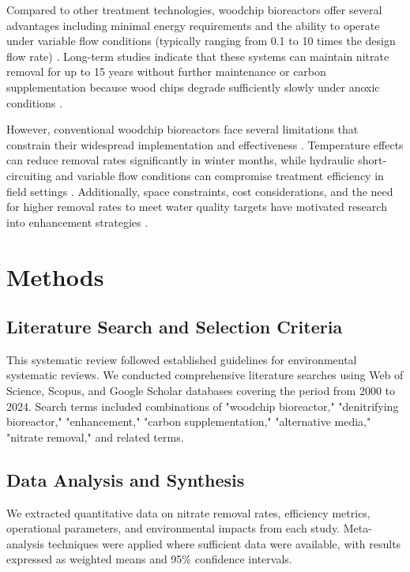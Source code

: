 \documentclass[12pt,a4paper]{article}
\begin{document}
Compared to other treatment technologies, woodchip bioreactors offer several advantages including minimal energy requirements and the ability to operate under variable flow conditions (typically ranging from 0.1 to 10 times the design flow rate) \citep{RN625, RN310}. Long-term studies indicate that these systems can maintain nitrate removal for up to 15 years without further maintenance or carbon supplementation because wood chips degrade sufficiently slowly under anoxic conditions \citep{RN625, RN629}.

However, conventional woodchip bioreactors face several limitations that constrain their widespread implementation and effectiveness \citep{RN625, RN228, RN258}. Temperature effects can reduce removal rates significantly in winter months, while hydraulic short-circuiting and variable flow conditions can compromise treatment efficiency in field settings \citep{RN228, RN309}. Additionally, space constraints, cost considerations, and the need for higher removal rates to meet water quality targets have motivated research into enhancement strategies \citep{RN242, RN258}.

\section{Methods}

\subsection{Literature Search and Selection Criteria}

This systematic review followed established guidelines for environmental systematic reviews. We conducted comprehensive literature searches using Web of Science, Scopus, and Google Scholar databases covering the period from 2000 to 2024. Search terms included combinations of "woodchip bioreactor," "denitrifying bioreactor," "enhancement," "carbon supplementation," "alternative media," "nitrate removal," and related terms.

\subsection{Data Analysis and Synthesis}

We extracted quantitative data on nitrate removal rates, efficiency metrics, operational parameters, and environmental impacts from each study. Meta-analysis techniques were applied where sufficient data were available, with results expressed as weighted means and 95\% confidence intervals.
\end{document}
